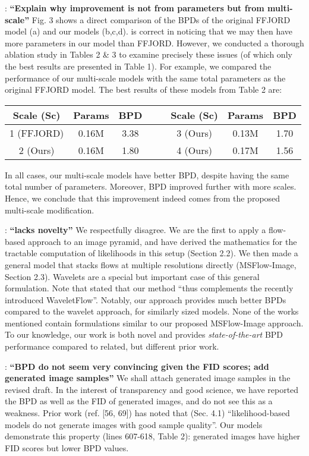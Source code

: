 \documentclass[rebuttal]{cvpr}
\begin{document}
\rb : \textbf{“Explain why improvement is not from parameters but from multi-scale”}
Fig. 3 shows a direct comparison of the BPDs of the original FFJORD model (a) and our models (b,c,d). \rb{} is correct in noticing that we may then have more parameters in our model than FFJORD. However, we conducted a thorough ablation study in Tables 2 \& 3 to examine precisely these issues (of which only the best results are presented in Table 1). For example, we compared the performance of our multi-scale models with the same total parameters as the original FFJORD model. The best results of these models from Table 2 are:
\vspace{-1em}
\begin{table}[ht]
\small
\setlength{\tabcolsep}{4pt}
\centering
\begin{tabular}{cccc|cccc}
Scale (Sc) & Params & BPD & & & Scale (Sc) & Params & BPD\\
\hline
1 (FFJORD) & 0.16M & 3.38 & & &
3 (Ours) & 0.13M & 1.70\\
2 (Ours) & 0.16M & 1.80 & & &
4 (Ours) & 0.17M & 1.56\\
\end{tabular}
\label{tab:rebuttal}
\vspace{-1.5em}
\end{table}

In all cases, our multi-scale models have better BPD, despite having the same total number of parameters. Moreover, BPD improved further with more scales. Hence, we conclude that this improvement indeed comes from the proposed multi-scale modification.


\ra : \textbf{“lacks novelty”}
We respectfully disagree. We are the first to apply a flow-based approach to an image pyramid, and have derived the mathematics for the tractable computation of likelihoods in this setup (Section 2.2). We then made a general model that stacks flows at multiple resolutions directly (MSFlow-Image, Section 2.3). Wavelets are a special but important case of this general formulation. Note that \rc{} stated that our method “thus complements the recently introduced WaveletFlow”. Notably, our approach provides much better BPDs compared to the wavelet approach, for similarly sized models. None of the works \ra{} mentioned contain formulations similar to our proposed MSFlow-Image approach. To our knowledge, our work is both novel and provides \textit{state-of-the-art} BPD performance compared to related, but different prior work.

\ra : \textbf{“BPD do not seem very convincing given the FID scores; add generated image samples”}
We shall attach generated image samples in the revised draft. In the interest of transparency and good science, we have reported the BPD as well as the FID of generated images, and do not see this as a weakness. Prior work (ref. [56, 69]) has noted that (Sec. 4.1) “likelihood-based models do not generate images with good sample quality”. Our models demonstrate this property (lines 607-618, Table 2): generated images have higher FID scores but lower BPD values.
\end{document}
